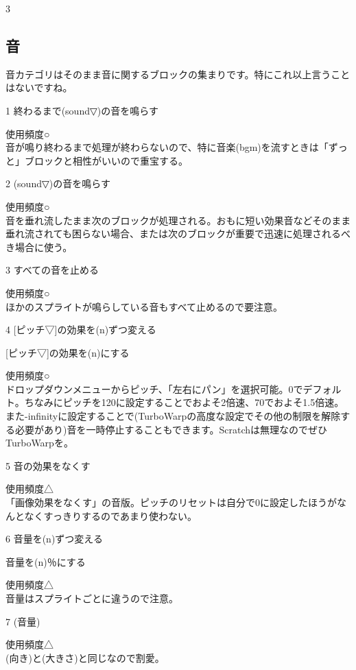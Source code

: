\documentclass[b5paper,10pt]{jsarticle}
\begin{document}
\begin{multicols*}{3}
\subsection{音}
音カテゴリはそのまま音に関するブロックの集まりです。特にこれ以上言うことはないですね。
\begin{itembox}{1}
終わるまで(sound▽)の音を鳴らす
\end{itembox}
使用頻度○\\
音が鳴り終わるまで処理が終わらないので、特に音楽(bgm)を流すときは「ずっと」ブロックと相性がいいので重宝する。
\begin{itembox}{2}
(sound▽)の音を鳴らす
\end{itembox}
使用頻度○\\
音を垂れ流したまま次のブロックが処理される。おもに短い効果音などそのまま垂れ流されても困らない場合、または次のブロックが重要で迅速に処理されるべき場合に使う。
\begin{itembox}{3}
すべての音を止める
\end{itembox}
使用頻度○\\
ほかのスプライトが鳴らしている音もすべて止めるので要注意。
\begin{itembox}{4}
[ピッチ▽]の効果を(n)ずつ変える

[ピッチ▽]の効果を(n)にする
\end{itembox}
使用頻度○\\
ドロップダウンメニューからピッチ、「左右にパン」を選択可能。0でデフォルト。ちなみにピッチを120に設定することでおよそ2倍速、70でおよそ1.5倍速。また-infinityに設定することで(TurboWarpの高度な設定でその他の制限を解除する必要があり)音を一時停止することもできます。Scratchは無理なのでぜひTurboWarpを。
\begin{itembox}{5}
音の効果をなくす
\end{itembox}
使用頻度△\\
「画像効果をなくす」の音版。ピッチのリセットは自分で0に設定したほうがなんとなくすっきりするのであまり使わない。
\begin{itembox}{6}
音量を(n)ずつ変える

音量を(n)％にする
\end{itembox}
使用頻度△\\
音量はスプライトごとに違うので注意。
\begin{itembox}{7}
(音量)
\end{itembox}
使用頻度△\\
(向き)と(大きさ)と同じなので割愛。


\end{multicols*}
\end{document}
